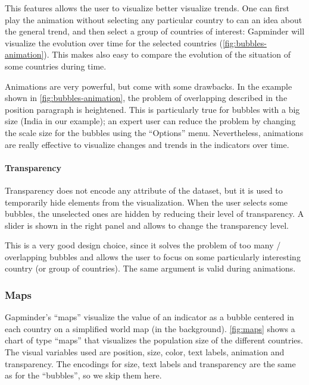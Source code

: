 This features allows the user to visualize better visualize trends.
One can first play the animation without selecting any particular country to can an idea about the general trend, and then select a group of countries of interest:
Gapminder will visualize the evolution over time for the selected countries (\cref{fig:bubbles-animation}).
This makes also easy to compare the evolution of the situation of some countries during time.

Animations are very powerful, but come with some drawbacks.
In the example shown in \cref{fig:bubbles-animation}, the problem of overlapping described in the position paragraph is heightened.
This is particularly true for bubbles with a big size (India in our example);
an expert user can reduce the problem by changing the scale size for the bubbles using the ``Options'' menu.
Nevertheless, animations are really effective to visualize changes and trends in the indicators over time.

\paragraph{Transparency}
Transparency does not encode any attribute of the dataset, but it is used to temporarily hide elements from the visualization.
When the user selects some bubbles, the unselected ones are hidden by reducing their level of transparency.
A slider is shown in the right panel and allows to change the transparency level.

This is a very good design choice, since it solves the problem of too many / overlapping bubbles and allows the user to focus on some particularly interesting country (or group of countries).
The same argument is valid during animations.


\subsubsection{Maps}
Gapminder's ``maps'' visualize the value of an indicator as a bubble centered in each country on a simplified world map (in the background).
\cref{fig:maps} shows a chart of type ``maps'' that visualizes the population size of the different countries.
The visual variables used are position, size, color, text labels, animation and transparency.
The encodings for size, text labels and transparency are the same as for the ``bubbles'', so we skip them here.

